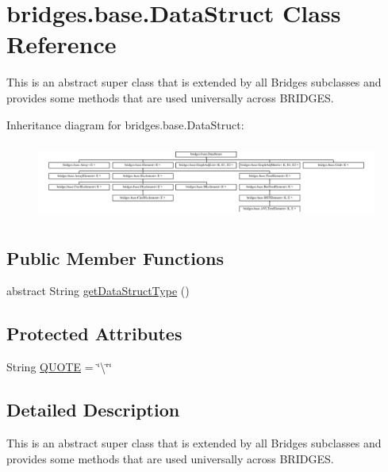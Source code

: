 \hypertarget{classbridges_1_1base_1_1_data_struct}{}\section{bridges.\+base.\+Data\+Struct Class Reference}
\label{classbridges_1_1base_1_1_data_struct}


This is an abstract super class that is extended by all Bridges subclasses and provides some methods that are used universally across B\+R\+I\+D\+G\+ES.  


Inheritance diagram for bridges.\+base.\+Data\+Struct\+:\begin{figure}[H]
\begin{center}
\leavevmode
\includegraphics[height=2.526316cm]{classbridges_1_1base_1_1_data_struct}
\end{center}
\end{figure}
\subsection*{Public Member Functions}
\begin{DoxyCompactItemize}
\item 
abstract String \mbox{\hyperlink{classbridges_1_1base_1_1_data_struct_a3bae9d0d68a85e517a34be482e90fdd4}{get\+Data\+Struct\+Type}} ()
\end{DoxyCompactItemize}
\subsection*{Protected Attributes}
\begin{DoxyCompactItemize}
\item 
String \mbox{\hyperlink{classbridges_1_1base_1_1_data_struct_aac4a6ea28f44676274120ba1dddafc1f}{Q\+U\+O\+TE}} = \char`\"{}\textbackslash{}\char`\"{}\char`\"{}
\end{DoxyCompactItemize}


\subsection{Detailed Description}
This is an abstract super class that is extended by all Bridges subclasses and provides some methods that are used universally across B\+R\+I\+D\+G\+ES. 

